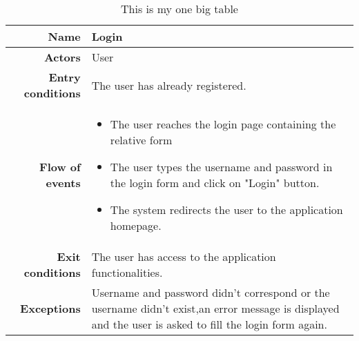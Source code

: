 \begin{table}

\begin{tabular}{r|p{7cm}}
\bf\large Name&\bf\large Login\\
\hline
\hline
\bf Actors&User\\
\hline
\bf Entry conditions&The user has already registered.\\
\hline
\bf Flow of events&
\begin{itemize}
\item The user reaches the login page containing the relative form
\item The user types the username and password in the login form and click on "Login" button.
\item The system redirects the user to the application homepage.
\end{itemize}
\\
\hline
\bf Exit conditions&The user has access to the application functionalities. \\
\hline
\bf Exceptions&Username and password didn't correspond or the username didn't exist,an error message is displayed and the user is asked to fill the login form again.\\
\hline

\end{tabular}

\caption{This is my one big table} \label{tab:login}
\end{table}